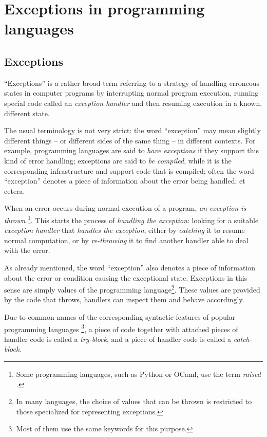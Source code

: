 \chapter{Exceptions in programming languages}

\section{Exceptions}

``Exceptions'' is a rather broad term referring to a strategy of handling erroneous
states in computer programs by interrupting normal program execution, running special
code called an \emph{exception handler} and then resuming execution in a known, different
state.

The usual terminology is not very strict: the word ``exception'' may mean slightly
different things -- or different sides of the same thing -- in different contexts.
For example, programming languages are said to \emph{have exceptions} if they support
this kind of error handling; exceptions are said to \emph{be compiled}, while it is the
corresponding infrastructure and support code that is compiled; often the word ``exception''
denotes a piece of information about the error being handled; et cetera.

When an error occurs during normal execution of a program, \emph{an exception is thrown}%
\footnote{Some programming languages, such as Python or OCaml, use the term \emph{raised}
\cite{python:reference}.}.
This starts the
process of \emph{handling the exception}: looking for a suitable
\emph{exception handler} that \emph{handles the exception}, either by \emph{catching} it
to resume normal computation, or by \emph{re-throwing} it to find another handler
able to deal with the error.

As already mentioned, the word ``exception'' also denotes a piece of information about
the error or condition causing the exceptional state. Exceptions in this sense are
simply values of the programming language\footnote{In many languages, the choice of values that
can be thrown is restricted to those specialized for representing exceptions.}.
These values are provided by the code that throws,
handlers can inspect them and behave accordingly.

Due to common names of the corresponding syntactic features of popular programming languages%
\footnote{Most of them use the same keywords for this purpose.},
a piece of code together with attached pieces of handler code is called a \emph{try-block},
and a piece of handler code is called a \emph{catch-block}.


